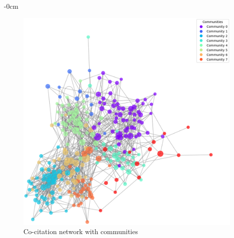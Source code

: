 \documentclass[jmse,review,submit,pdftex,moreauthors]{Definitions/mdpi}
\begin{document}
\begin{adjustwidth}{-\extralength}{0cm}
\begin{figure}[H]
	\centering
	\includegraphics[width=\linewidth]{pics/cocitation_communiities.eps}
	\caption{Co-citation network with communities}\label{fig:fig9}
\end{figure}


\end{adjustwidth}
\end{document}
